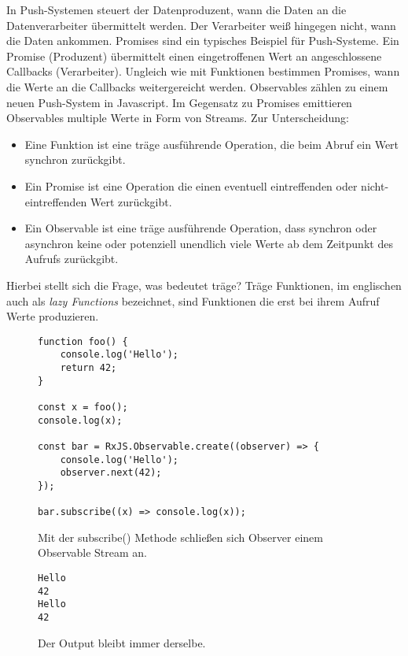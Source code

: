 \noindent
In Push-Systemen steuert der Datenproduzent, wann die Daten an die Datenverarbeiter übermittelt werden. Der Verarbeiter weiß hingegen nicht, wann die Daten ankommen. Promises sind ein typisches Beispiel für Push-Systeme. Ein Promise (Produzent) übermittelt einen eingetroffenen Wert an angeschlossene Callbacks (Verarbeiter). Ungleich wie mit Funktionen bestimmen Promises, wann die Werte an die Callbacks weitergereicht werden. Observables zählen zu einem neuen Push-System in Javascript. Im Gegensatz zu Promises emittieren Observables multiple Werte in Form von Streams. Zur Unterscheidung:

\begin{itemize}
\item Eine Funktion ist eine träge ausführende Operation, die beim Abruf ein Wert synchron zurückgibt.
\item Ein Promise ist eine Operation die einen eventuell eintreffenden oder nicht-eintreffenden Wert zurückgibt.
\item Ein Observable ist eine träge ausführende Operation, dass synchron oder asynchron keine oder potenziell unendlich viele Werte ab dem Zeitpunkt des Aufrufs zurückgibt.
\end{itemize}

\noindent
Hierbei stellt sich die Frage, was bedeutet träge? Träge Funktionen, im englischen auch als \textit{lazy Functions} bezeichnet, sind Funktionen die erst bei ihrem Aufruf Werte produzieren\cite{lazy-functions}.

\begin{figure}[H]
\begin{lstlisting}[basicstyle=\small]
function foo() {
    console.log('Hello');
    return 42;
}

const x = foo();
console.log(x);

const bar = RxJS.Observable.create((observer) => {
    console.log('Hello');
    observer.next(42);
});

bar.subscribe((x) => console.log(x));
\end{lstlisting}
\caption{Mit der subscribe() Methode schließen sich Observer einem Observable Stream an.}
\end{figure}

\begin{figure}[H]
\begin{lstlisting}
Hello
42
Hello
42
\end{lstlisting}
\caption{Der Output bleibt immer derselbe.}
\end{figure}

